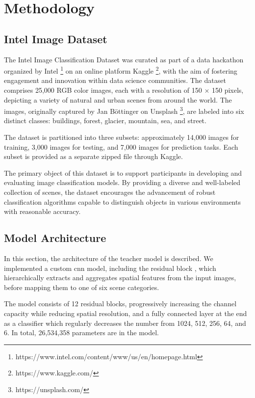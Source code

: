 \section{Methodology}

\subsection{Intel Image Dataset}

The Intel Image Classification Dataset \cite{intel_image_classification_kaggle} was curated
as part of a data hackathon organized
by Intel \footnote{https://www.intel.com/content/www/us/en/homepage.html}
on an online platform Kaggle \footnote{https://www.kaggle.com/},
with the aim of fostering engagement and innovation within data science communities.
The dataset comprises 25,000 RGB color images,
each with a resolution of 150 $\times$ 150 pixels,
depicting a variety of natural and urban scenes from around the world.
The images, originally captured by Jan Böttinger
on Unsplash \footnote{https://unsplash.com/},
are labeled into six distinct classes: buildings, forest, glacier, mountain, sea, and street.

The dataset is partitioned into three subsets: approximately 14,000 images for training,
3,000 images for testing, and 7,000 images for prediction tasks.
Each subset is provided as a separate zipped file through Kaggle.

The primary object of this dataset is to support participants
in developing and evaluating image classification models.
By providing a diverse and well-labeled collection of scenes,
the dataset encourages the advancement of robust classification algorithms
capable to distinguish objects in various environments with reasonable accuracy.

\subsection{Model Architecture}
\label{sec:method:model_architecture}

In this section, the architecture of the teacher model is described.
We implemented a custom \gls*{cnn} model, including the residual block \cite{he2016deep},
which hierarchically extracts and aggregates spatial features from the input images,
before mapping them to one of six scene categories.

The model consists of 12 residual blocks,
progressively increasing the channel capacity while reducing spatial resolution,
and a fully connected layer at the end as a classifier
which regularly decreases the number from 1024, 512, 256, 64, and 6.
In total, 26,534,358 parameters are in the model.

